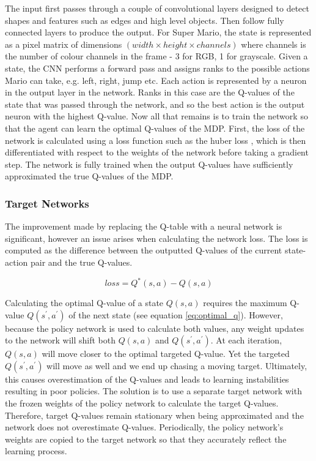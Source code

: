 \documentclass[notitlepage,a4paper,11pt]{article}
\begin{document}
The input first passes through a couple of convolutional layers designed to detect shapes and features such as edges and high level objects. Then follow fully connected layers to produce the output. For Super Mario, the state is represented as a pixel matrix of dimensions $(width \times height \times channels)$ where channels is the number of colour channels in the frame - 3 for RGB, 1 for grayscale. Given a state, the CNN performs a forward pass and assigns ranks to the possible actions Mario can take, e.g. left, right, jump etc. Each action is represented by a neuron in the output layer in the network. Ranks in this case are the Q-values of the state that was passed through the network, and so the best action is the output neuron with the highest Q-value. Now all that remains is to train the network so that the agent can learn the optimal Q-values of the MDP. First, the loss of the network is calculated using a loss function such as the huber loss \cite{huber1992robust}, which is then differentiated with respect to the weights of the network before taking a gradient step. The network is fully trained when the output Q-values have sufficiently approximated the true Q-values of the MDP.  

\subsubsection{Target Networks}
The improvement made by replacing the Q-table with a neural network is significant, however an issue arises when calculating the network loss. The loss is computed as the difference between the outputted Q-values of the current state-action pair and the true Q-values. 

\begin{equation} \label{eq:q_loss}
	loss = Q^*(s,a) - Q(s,a) 
\end{equation}

Calculating the optimal Q-value of a state $Q(s,a)$ requires the maximum Q-value $Q(s^\prime, a^\prime)$ of the next state (see equation \ref{eq:optimal_q}). However, because the policy network is used to calculate both values, any weight updates to the network will shift both $Q(s,a)$ and $Q(s^\prime, a^\prime)$. At each iteration, $Q(s,a)$ will move closer to the optimal targeted Q-value. Yet the targeted $Q(s^\prime, a^\prime)$ will move as well and we end up chasing a moving target. Ultimately, this causes overestimation of the Q-values and leads to learning instabilities resulting in poor policies. The solution is to use a separate target network with the frozen weights of the policy network to calculate the target Q-values. Therefore, target Q-values remain stationary when being approximated and the network does not overestimate Q-values. Periodically, the policy network's weights are copied to the target network so that they accurately reflect the learning process.
\end{document}
